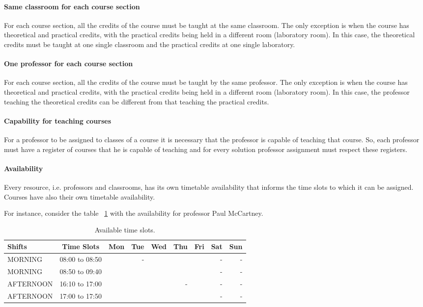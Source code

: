 \paragraph{Same classroom for each course section}
\label{constroneroom}

For each course section, all the credits of the course must be taught at the same classroom. The only exception is when the course has theoretical and practical credits, with the practical credits being held in a different room (laboratory room). In this case, the theoretical credits must be taught at one single classroom and the practical credits at one single laboratory.


\paragraph{One professor for each course section}
\label{constroneprof}

For each course section, all the credits of the course must be taught by the same professor. The only exception is when the course has theoretical and practical credits, with the practical credits being held in a different room (laboratory room). In this case, the professor teaching the theoretical credits can be different from that teaching the practical credits.


\paragraph{Capability for teaching courses}
\label{constrcapab}

For a professor to be assigned to classes of a course it is necessary that the professor is capable of teaching that course. So, each professor must have a register of courses that he is capable of teaching and for every solution professor assignment must respect these registers.


\paragraph{Availability}
\label{constravailab}

Every resource, i.e. professors and classrooms, has its own timetable availability that informs the time slots to which it can be assigned. Courses have also their own timetable availability.

For instance, consider the table ~\ref{tab:availabMT} with the availability for professor Paul McCartney.

\begin{table}[H]
\centering
\begin{tabular}{l|c|r|r|r|r|r|r|r}
Shifts & Time Slots & Mon & Tue & Wed & Thu & Fri & Sat & Sun \\\hline
MORNING & 08:00 to 08:50 & & - & & & & - & - \\
MORNING & 08:50 to 09:40 & & & & & & - & - \\
AFTERNOON & 16:10 to 17:00 & & & & - & & - & - \\
AFTERNOON & 17:00 to 17:50 & & & & & & - & -
\end{tabular}
\caption{\label{tab:availabMT}Available time slots.}
\end{table}

